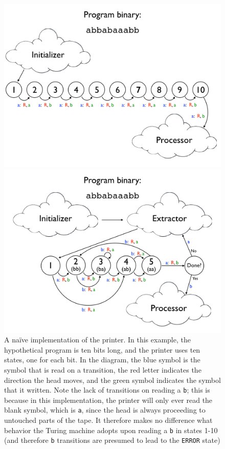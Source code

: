 \documentclass[11pt]{article}
\begin{document}
\begin{figure}
\begin{center}
\includegraphics[scale=0.28]{figs/naiveprog.png}
\caption{A na\"ive implementation of the printer. In this example, the hypothetical program is ten bits long, and the printer uses ten states, one for each bit. In the diagram, the blue symbol is the symbol that is read on a transition, the red letter indicates the direction the head moves, and the green symbol indicates the symbol that it written. Note the lack of transitions on reading a \texttt{b}; this is because in this implementation, the printer will only ever read the blank symbol, which is \texttt{a}, since the head is always proceeding to untouched parts of the tape. It therefore makes no difference what behavior the Turing machine adopts upon reading a \texttt{b} in states 1-10 (and therefore \texttt{b} transitions are presumed to lead to the \texttt{ERROR} state) \label{fig:naiveprog}}
\includegraphics[scale=0.28]{figs/introspectprog.png}

\end{center}
\end{figure}
\end{document}
